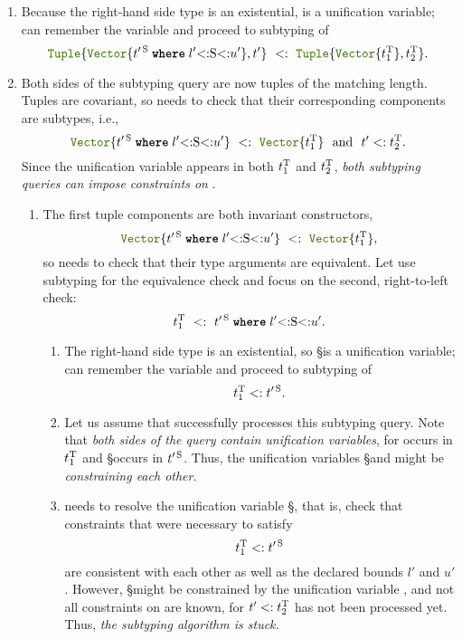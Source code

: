 \begin{enumerate}
  \item Because the right-hand side type is an existential,
    \T is a unification variable; \algo can remember the variable and proceed
    to subtyping of
    \[ 
      \tupletyp{\vectyp{\wheret{\t'^{\,\S}}{l'{<:}\S{<:}u'}}, \t'}
        \ <:\ 
        \tupletyp{\vectyp{\t_1^{\T}}, \t_2^{\T}}. 
    \]
  \item Both sides of the subtyping query are now tuples of the matching length.
    Tuples are covariant, so \algo needs to check that their corresponding 
    components are subtypes, i.e.,
    \[ 
      \vectyp{\wheret{\t'^{\,\S}}{l'{<:}\S{<:}u'}}\ <:\ \vectyp{\t_1^{\T}} 
      \ \ \text{and}\ \ \t' <: \t_2^{\T}.
    \]
    Since the unification variable \T appears in both $t_1^{\mathrm{T}}$ and $t_2^{\mathrm{T}}$,
    \emph{both subtyping queries can impose constraints on \T}.
    \begin{enumerate}
      \item The first tuple components are both invariant constructors,
        \[ 
          \vectyp{\wheret{\t'^{\,\S}}{l'{<:}\S{<:}u'}} 
          \ <:\  
          \vectyp{\t_1^{\T}}, 
        \]
        so \algo needs to check that their type arguments are equivalent.
        Let \algo use subtyping for the equivalence check and focus
        on the second, right-to-left check:
        \[ \t_1^{\T}\ <:\ \wheret{\t'^{\,\S}}{l'{<:}\S{<:}u'}. \]
        \begin{enumerate}
          \item The right-hand side type is an existential, so \S is a unification
            variable; \algo can remember the variable and proceed to 
            subtyping of \[ t_1^{\mathrm{T}} <: t'^{\,\mathrm{S}}. \]
          \item Let us assume that \algo successfully processes this subtyping
            query. Note that \emph{both sides of the query contain
            unification variables}, for \T occurs in $t_1^{\mathrm{T}}$
            and \S occurs in $t'^{\,\mathrm{S}}$.
            Thus, the unification variables \S and \T might
            be \emph{constraining each other}.
          \item\label{item:sub-stuck} \algo needs to resolve the unification variable \S, that is,
            check that constraints that were necessary to satisfy 
            \[ t_1^{\mathrm{T}} <: t'^{\,\mathrm{S}} \]
            are consistent with each other as well as the declared bounds
            $l'$ and $u'$.
            However, \S might be constrained by the unification variable \T,
            and not all constraints on \T are known, for $t' <: t_2^{\mathrm{T}}$
            has not been processed yet.
            Thus, \emph{the subtyping algorithm \algo is stuck.}
        \end{enumerate}
    \end{enumerate}
\end{enumerate}

